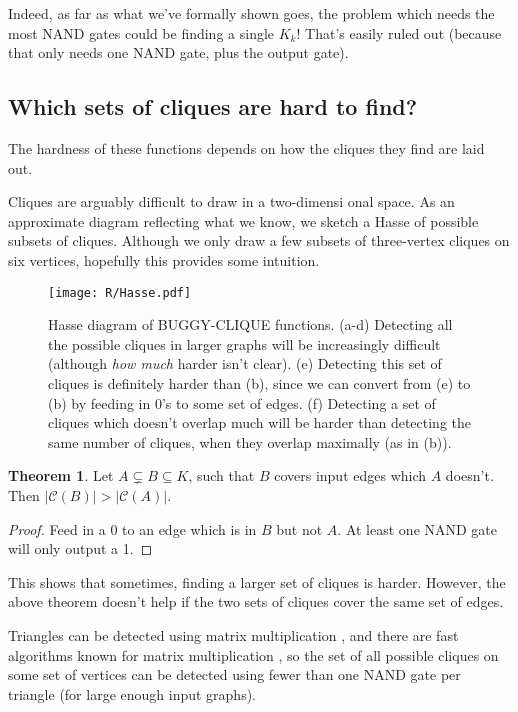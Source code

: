 \documentclass[12pt]{article}
\theoremstyle{definition}
\newtheorem{thm}{Theorem}[section]
\newcommand{\bigC}[0]{\mathcal{C}}
\begin{document}
Indeed, as far as what we've formally shown goes, the problem which needs
the most NAND gates could be finding a single $K_k$! That's easily ruled out
(because that only needs one NAND gate, plus the output gate).

\subsection{Which sets of cliques are hard to find?}
\label{sec:whichCliques}

The hardness of these functions depends
on how the cliques they find are laid out.

Cliques are arguably difficult to draw in a two-dimensi onal space.
As an approximate diagram reflecting what we know,
we sketch a Hasse of possible subsets of cliques. Although
we only draw a few subsets of three-vertex cliques
on six vertices, hopefully this provides some
intuition.

\begin{figure}
\centering
\texttt{[image: R/Hasse.pdf]}
\caption{Hasse diagram of BUGGY-CLIQUE functions.
(a-d) 
Detecting all the possible cliques in larger graphs will be
increasingly difficult (although {\em how much} harder isn't clear).
(e) 
Detecting this set of cliques is definitely harder than (b),
since we can convert from (e) to (b) by feeding in 0's to
some set of edges.
(f) Detecting a set of cliques which doesn't overlap much will be
harder than detecting the same number of cliques, when they overlap
maximally (as in (b)).}
\label{fig:Hasse}
\end{figure}


\begin{thm}
\label{edgeZonking}
Let $A \subsetneq B \subseteq K$, such that $B$ covers input edges
which $A$ doesn't. Then $|\bigC(B)| > |\bigC(A)|$.
\end{thm}
\begin{proof}
Feed in a 0 to an edge which is in $B$ but not $A$. At least one
NAND gate will only output a 1.
\end{proof}

This shows that sometimes, finding a larger set of cliques is
harder. However, the above theorem doesn't help if the two
sets of cliques cover the same set of edges.

Triangles can be detected using matrix multiplication \cite{itai_finding_1977},
and there are fast algorithms known for matrix multiplication
\cite{strassen_gaussian_1969}
\cite{williams_multiplying_2012}, so the set of all possible
cliques on some set of vertices
 can be detected
using fewer than one NAND gate per triangle (for large enough input graphs).
\end{document}
